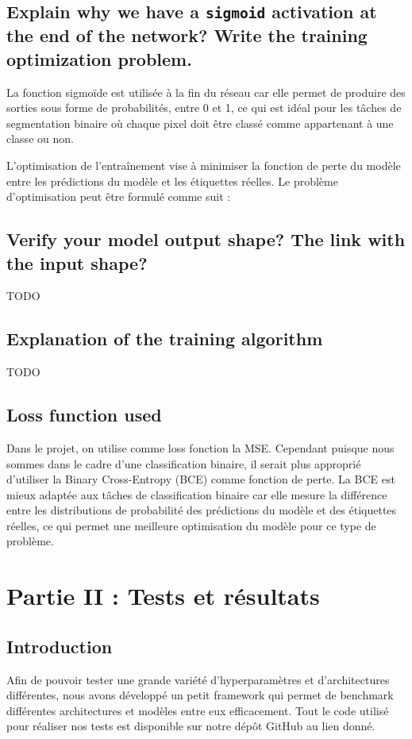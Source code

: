 \documentclass{name}
\begin{document}
\subsection{Explain why we have a \texttt{sigmoid} activation at the end of the network? Write the training optimization problem.}
La fonction sigmoïde est utilisée à la fin du réseau car elle permet de produire des sorties sous forme de probabilités, entre 0 et 1, ce qui est idéal pour les tâches de segmentation binaire où chaque pixel doit être classé comme appartenant à une classe ou non. 

L'optimisation de l'entraînement vise à minimiser la fonction de perte du modèle entre les prédictions du modèle et les étiquettes réelles. Le problème d'optimisation peut être formulé comme suit :

\subsection{Verify your model output shape? The link with the input shape?}
TODO

\subsection{Explanation of the training algorithm}
TODO

\subsection{Loss function used}
Dans le projet, on utilise comme loss fonction la MSE. 
Cependant puisque nous sommes dans le cadre d'une classification binaire, il serait plus approprié d'utiliser la Binary Cross-Entropy (BCE) comme fonction de perte.
La BCE est mieux adaptée aux tâches de classification binaire car elle mesure la différence entre les distributions de probabilité des prédictions du modèle et des étiquettes réelles, ce qui permet une meilleure optimisation du modèle pour ce type de problème.

\section{Partie II : Tests et résultats}

\subsection{Introduction}
Afin de pouvoir tester une grande variété d'hyperparamètres et d'architectures différentes, nous avons développé un petit framework qui permet de benchmark différentes architectures et modèles entre eux efficacement. Tout le code utilisé pour réaliser nos tests est disponible sur notre dépôt GitHub au lien donné.
\end{document}
